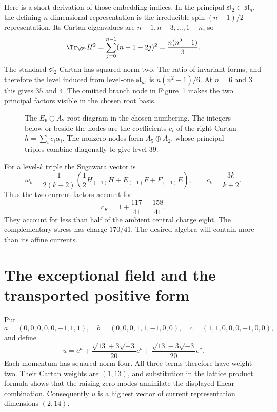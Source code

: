 Here is a short derivation of those embedding indices. In the
principal $\mathfrak{sl}_2\subset\mathfrak{sl}_n$, the defining
$n$-dimensional representation is the irreducible spin
$(n-1)/2$ representation. Its Cartan eigenvalues are
$n-1,n-3,\ldots,1-n$, so
\[
 \Tr_{\C^n}H^2=\sum_{j=0}^{n-1}(n-1-2j)^2
             =\frac{n(n^2-1)}3.
\]
The standard $\mathfrak{sl}_2$ Cartan has squared norm two.
The ratio of invariant forms, and therefore the level induced
from level-one $\mathfrak{sl}_n$, is
$n(n^2-1)/6$. At $n=6$ and $3$ this gives $35$ and $4$.
The omitted branch node in Figure~\ref{fig:c-principal-diagram}
makes the two principal factors visible in the chosen root basis.

\begin{figure}[htbp]
\centering

\caption{The $E_6\oplus A_2$ root diagram in the chosen numbering.
The integers below or beside the nodes are the coefficients
$c_i$ of the right Cartan $h=\sum_i c_i\alpha_i$. The nonzero
nodes form $A_5\oplus A_2$, whose principal triples combine
diagonally to give level $39$.}
\label{fig:c-principal-diagram}
\end{figure}

For a level-$k$ triple the Sugawara vector is
\begin{equation}\label{eq:c-sugawara}
 \omega_k=\frac1{2(k+2)}
 \left(\frac12H_{(-1)}H+E_{(-1)}F+F_{(-1)}E\right),
 \qquad c_k=\frac{3k}{k+2}.
\end{equation}
Thus the two current factors account for
\[
 c_K=1+\frac{117}{41}=\frac{158}{41}.
\]
They account for less than half of the ambient central charge eight.
The complementary stress has charge $170/41$. The desired algebra
will contain more than its affine currents.

\section{The exceptional field and the transported positive form}

Put
\[
 a=(0,0,0,0,0,-1,1,1),\quad
 b=(0,0,0,1,1,-1,0,0),\quad
 c=(1,1,0,0,0,-1,0,0),
\]
and define
\begin{equation}\label{eq:c-u}
 u=e^a+\frac{\sqrt{13}+3\sqrt{-3}}{20}e^b
       +\frac{\sqrt{13}-3\sqrt{-3}}{20}e^c.
\end{equation}
Each momentum has squared norm four. All three terms therefore have weight two.
Their Cartan weights are $(1,13)$, and substitution in the lattice
product formula shows that the raising zero modes annihilate the
displayed linear combination. Consequently $u$ is a highest vector of
current representation dimensions $(2,14)$.


